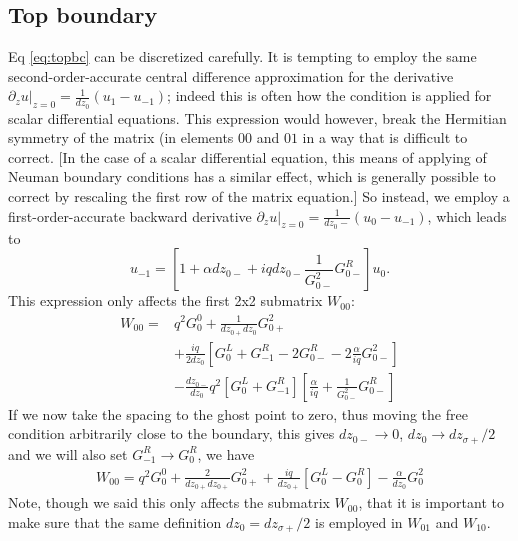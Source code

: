 \documentclass{article}
\begin{document}
\subsection{Top boundary}
Eq \eqref{eq:topbc} can be discretized carefully.  It is tempting to employ the same second-order-accurate central difference approximation for the derivative $\partial_z u|_{z=0}=\frac{1}{dz_0}(u_1-u_{-1})$; indeed this is often how the condition is applied for scalar differential equations.  This expression would however, break the Hermitian symmetry of the matrix (in elements $00$ and $01$ in a way that is difficult to correct.  [In the case of a scalar differential equation, this means of applying of Neuman boundary conditions has a similar effect, which is generally possible to correct by rescaling the first row of the matrix equation.]  So instead, we employ a first-order-accurate backward derivative $\partial_z u|_{z=0}=\frac{1}{dz_0-}(u_0-u_{-1})$, which leads to
\begin{equation}
  u_{-1}=\left[ 1+\alpha dz_{0-}+iqdz_{0-}\frac{1}{G^2_{0-}}G^R_{0-} \right]u_0.
\end{equation}
This expression only affects the first 2x2 submatrix $W_{0 0}$:
  \begin{align}
    W_{0 0}=&q^2G_0^0 + \frac{1}{dz_{0+}dz_0}G^2_{0+}\\
    &+\frac{iq}{2dz_0}\left[ G_0^L+G_{-1}^R-2G_{0-}^R-2\frac{\alpha}{iq}G_{0-}^2 \right]\\
  &-\frac{dz_{0-}}{dz_0}q^2\left[ G^L_0+G^R_{-1} \right]\left[\frac{\alpha}{iq}+\frac{1}{G^2_{0-}}G^R_{0-}\right]
  \end{align}
  If we now take the spacing to the ghost point to zero, thus moving the free condition arbitrarily close to the boundary, this gives $dz_{0-}\rightarrow 0$, $dz_0\rightarrow dz_{\sigma+}/2$ and  we will also set $G^R_{-1}\rightarrow G^R_0$, we have
  \begin{align}
    W_{0 0}=q^2G_0^0 + \frac{2}{dz_{0+}dz_{0+}}G^2_{0+}
    +\frac{iq}{dz_{0+}}\left[ G_0^L-G_{0}^R\right]-\frac{\alpha}{dz_0}G^2_{0}
  \end{align}
  Note, though we said this only affects the submatrix $W_{00}$, that it is important to make sure that the same definition $dz_0=dz_{\sigma+}/2$ is employed in $W_{01}$ and $W_{10}$.
\end{document}
